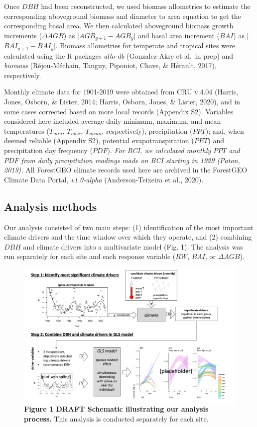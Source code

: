 \documentclass[
]{article}
\begin{document}
Once \(DBH\) had been reconstructed, we used biomass allometries to
estimate the corresponding aboveground biomass and diameter to area
equation to get the corresponding basal area. We then calculated
aboveground biomass growth increments (\(\Delta AGB\)) as
{[}\(AGB_{y+1}-AGB_y\){]} and basal area increment (\(BAI\)) as
{[}\(BAI_{y+1}-BAI_y\){]}. Biomass allometries for temperate and
tropical sites were calculated using the R packages \emph{allo-db}
(Gonzalez-Akre et al.~in prep) and \emph{biomass} (Réjou-Méchain,
Tanguy, Piponiot, Chave, \& Hérault, 2017), respectively.

Monthly climate data for 1901-2019 were obtained from CRU v.4.04
(Harris, Jones, Osborn, \& Lister, 2014; Harris, Osborn, Jones, \&
Lister, 2020), and in some cases corrected based on more local records
(Appendix S2). Variables considered here included average daily minimum,
maximum, and mean temperatures (\(T_{min}\), \(T_{max}\), \(T_{mean}\),
respectively); precipitation (\(PPT\)); and, when deemed reliable
(Appendix S2), potential evapotranspiration (\(PET\)) and precipitation
day frequency (\(PDF\)). \emph{For BCI, we calculated monthly \(PPT\)
and \(PDF\) from daily precipitation readings made on BCI starting in
1929 (Paton, 2019).} All ForestGEO climate records used here are
archived in the ForestGEO Climate Data Portal, \emph{v1.0-alpha}
(Anderson-Teixeira et al., 2020).

\hypertarget{analysis-methods}{%
\subsection{Analysis methods}\label{analysis-methods}}

Our analysis consisted of two main steps: (1) identification of the most
important climate drivers and the time window over which they operate,
and (2) combining \(DBH\) and climate drivers into a multivariate model
(Fig. 1). The analysis was run separately for each site and each
response variable (\(RW\), \(BAI\), or \(\Delta AGB\)).

\begin{figure}
\centering
\includegraphics{tables_figures/schematic_figure.png}
\caption{\textbf{Figure 1 \textbar{} DRAFT Schematic illustrating our
analysis process.} This analysis is conducted separately for each site.}
\end{figure}
\end{document}
